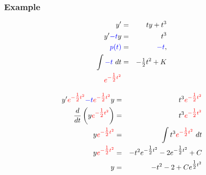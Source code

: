 \begin{frame}
  \frametitle{Example}

  \vspace*{-3em}
  \begin{eqnarray*}
    y' & = & ty + t^3 \\
    y' {\color{blue}- t}y & = & t^3 \\
    {\color{blue}p(t)} & = & {\color{blue}-t}, \\
    \int {\color{blue}-t} ~ dt & = & -\mbox{$\frac{1}{2}$} t^2 + K \\
    {\color{red}e^{-\mbox{$\frac{1}{2}$} t^2}} & &
  \end{eqnarray*}

  \begin{eqnarray*}
    y' {\color{red}e^{-\mbox{$\frac{1}{2}$} t^2}} {\color{blue} - t} {\color{red}e^{-\mbox{$\frac{1}{2}$} t^2}} y & = & t^3 {\color{red}e^{-\mbox{$\frac{1}{2}$} t^2}} \\
    \frac{d}{dt} \left( y {\color{red}e^{-\mbox{$\frac{1}{2}$} t^2}} \right) & = &  t^3 {\color{red}e^{-\mbox{$\frac{1}{2}$} t^2}} \\
     y {\color{red}e^{-\mbox{$\frac{1}{2}$} t^2}}  & = & \int t^3 {\color{red}e^{-\mbox{$\frac{1}{2}$} t^2}} ~ dt \\
    y {\color{red}e^{-\mbox{$\frac{1}{2}$} t^2}} & = & -t^2 e^{-\mbox{$\frac{1}{2}$} t^2} - 2 e^{-\mbox{$\frac{1}{2}$} t^2} + C \\
    y & = & -t^2 - 2 + C e^{\mbox{$\frac{1}{2}$} t^2}
  \end{eqnarray*}

\end{frame}


